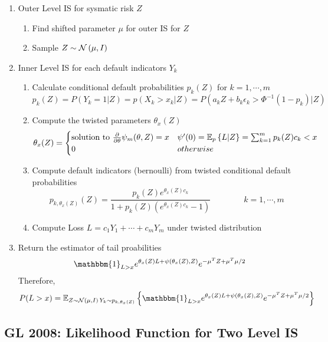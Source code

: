 \documentclass[11pt]{article}
\begin{document}
\begin{enumerate}
    \item Outer Level IS for sysmatic risk $Z$ 
    \begin{enumerate}
        \item Find shifted parameter $\mu$ for outer IS for $Z$
        \item Sample $Z \sim \normal{\mu, I}$ 
    \end{enumerate}
    \item Inner Level IS for each default indicators $Y_k$ 
    \begin{enumerate}
        \item Calculate conditional default probabilities $p_k(Z)$ for $k=1,\cdots, m$
        \[
            p_k(Z) = P(Y_k=1 | Z) = p(X_k > x_k | Z) = P(a_k Z + b_k \epsilon_k > \Phi^{-1}(1-p_k) | Z)
        \]
        \item Compute the twisted parameters $\theta_x(Z)$ 
        \[
            \theta_x(Z) = 
            \begin{cases}
                \text{solution to } \frac{\partial}{\partial \theta}\psi_m(\theta, Z) = x & \psi'(0) = \E[p]{L|Z} = \sum_{k=1}^m p_k(Z) c_k < x \\ 
                0 & otherwise \\ 
            \end{cases}    
        \]
        \item Compute default indicators (bernoulli) from twisted conditional default probabilities
        \[
            p_{k,\theta_x(Z)} (Z) = \frac{p_k(Z) e^{\theta_x(Z)c_k}}{1 + p_k(Z)(e^{\theta_x(Z)c_k} - 1)}
            \qquad 
            \qquad 
            k = 1,\cdots, m
        \]
        \item Compute Loss $L = c_1 Y_1 + \cdots + c_m Y_m$ under twisted distribution
    \end{enumerate}
    \item Return the estimator of tail proabilities
    \[
        \mathbbm{1}_{L>x} e^{\theta_x(Z)L + \psi(\theta_x(Z), Z)} e^{ -\mu^T Z + \mu^T \mu /2 }
    \]
    Therefore,
    \[
        P(L > x) = \E[Z\sim \normal{\mu, I} \, Y_k \sim p_{k, \theta_x(Z)}]{
            \mathbbm{1}_{L>x} e^{\theta_x(Z)L + \psi(\theta_x(Z), Z)} e^{ -\mu^T Z + \mu^T \mu /2 }
        }
    \]
\end{enumerate}


\newpage 
\subsection*{GL 2008: Likelihood Function for Two Level IS}
\end{document}
